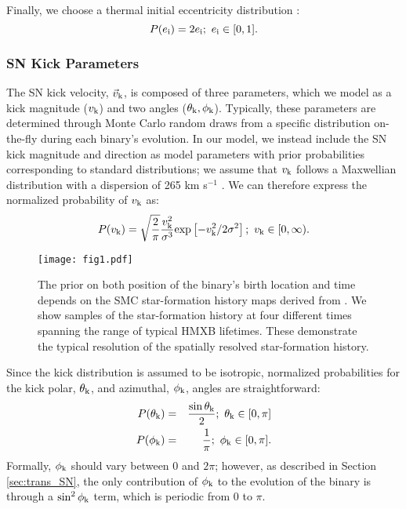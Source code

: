 \documentclass[usenatbib]{mnras}
\begin{document}
Finally, we choose a thermal initial eccentricity distribution \citep{duquennoy91}:
\begin{equation}
P(e_{\rm i}) = 2e_{\rm i};\ e_{\rm i} \in[0,1].
\end{equation}



\subsubsection{SN Kick Parameters}

The SN kick velocity, $\vec{v}_{\rm k}$, is composed of three parameters, which we model as a kick magnitude ($v_{\rm k}$) and two angles ($\theta_{\rm k}, \phi_{\rm k}$). Typically, these parameters are determined through Monte Carlo random draws from a specific distribution on-the-fly during each binary's evolution. In our model, we instead include the SN kick magnitude and direction as model parameters with prior probabilities corresponding to standard distributions; we assume that $v_{\rm k}$ follows a Maxwellian distribution with a dispersion of 265 km s$^{-1}$ \citep{hobbs05}. We can therefore express the normalized probability of $v_{\rm k}$ as:
\begin{equation}
P(v_{\rm k}) = \sqrt{\frac{2}{\pi}} \frac{v_{\rm k}^2} {\sigma^3} {\rm exp} \left[ -v_{\rm k}^2 / 2 \sigma^2 \right];\ v_{\rm k} \in [0, \infty). \label{eq:P_v_k}
\end{equation}


\begin{figure*}
\begin{center}
\texttt{[image: fig1.pdf]}
\caption{The prior on both position of the binary's birth location and time depends on the SMC star-formation history maps derived from \citet{harris04}. We show samples of the star-formation history at four different times spanning the range of typical HMXB lifetimes. These demonstrate the typical resolution of the spatially resolved star-formation history.}
\label{fig:SMC_SFH}
\end{center}
\end{figure*}



Since the kick distribution is assumed to be isotropic, normalized probabilities for the kick polar, $\theta_{\rm k}$, and azimuthal, $\phi_{\rm k}$, angles are straightforward:
\begin{eqnarray}
P(\theta_{\rm k}) &=& \frac{\sin \theta_{\rm k}}{2};\ \theta_{\rm k} \in [0, \pi] \label{eq:P_theta_k} \\
P(\phi_{\rm k}) &=& \frac{1}{\pi};\ \phi_{\rm k} \in [0, \pi] . \label{eq:P_phi_k}
\end{eqnarray}
Formally, $\phi_{\rm k}$ should vary between 0 and $2 \pi$; however, as described in Section \ref{sec:trans_SN}, the only contribution of $\phi_{\rm k}$ to the evolution of the binary is through a $\sin^2 \phi_{\rm k}$ term, which is periodic from 0 to $\pi$.
\end{document}
